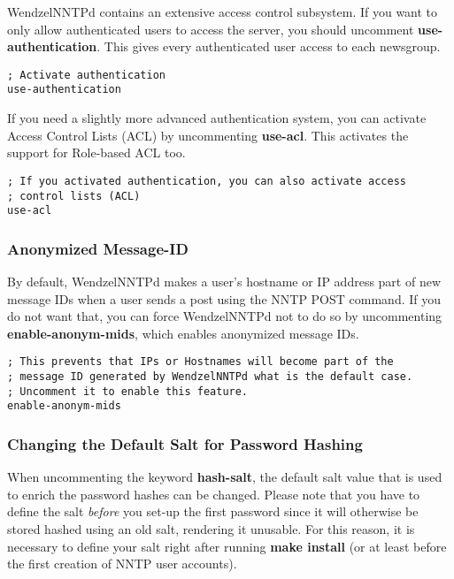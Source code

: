 \documentclass[12pt,fleqn,leqno]{scrbook}
\begin{document}
WendzelNNTPd contains an extensive access control subsystem. If you want
to only allow authenticated users to access the server, you should
uncomment \textbf{use-authentication}. This gives every authenticated
user access to each newsgroup.

\begin{verbatim}
; Activate authentication
use-authentication
\end{verbatim}

If you need a slightly more advanced authentication system, you can
activate Access Control Lists (ACL) by uncommenting \textbf{use-acl}.
This activates the support for Role-based ACL too.

\begin{verbatim}
; If you activated authentication, you can also activate access
; control lists (ACL)
use-acl
\end{verbatim}

\hypertarget{anonymized-message-id-1}{%
\subsubsection{Anonymized Message-ID}\label{anonymized-message-id-1}}

By default, WendzelNNTPd makes a user's hostname or IP address part of
new message IDs when a user sends a post using the NNTP POST command. If
you do not want that, you can force WendzelNNTPd not to do so by
uncommenting \textbf{enable-anonym-mids}, which enables anonymized
message IDs.

\begin{verbatim}
; This prevents that IPs or Hostnames will become part of the
; message ID generated by WendzelNNTPd what is the default case.
; Uncomment it to enable this feature.
enable-anonym-mids
\end{verbatim}

\hypertarget{changing-the-default-salt-for-password-hashing-1}{%
\subsubsection{Changing the Default Salt for Password
Hashing}\label{changing-the-default-salt-for-password-hashing-1}}

When uncommenting the keyword \textbf{hash-salt}, the default salt value
that is used to enrich the password hashes can be changed. Please note
that you have to define the salt \emph{before} you set-up the first
password since it will otherwise be stored hashed using an old salt,
rendering it unusable. For this reason, it is necessary to define your
salt right after running \textbf{make install} (or at least before the
first creation of NNTP user accounts).
\end{document}
